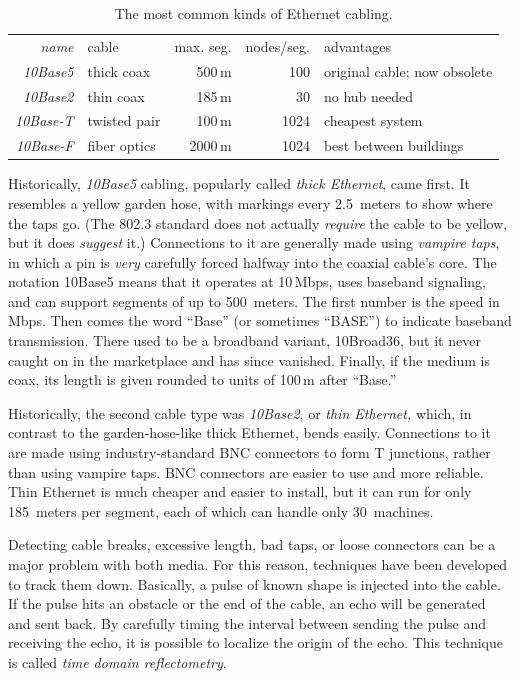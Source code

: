 \documentclass[b5paper,11pt]{memoir}
\begin{document}
\begin{table}
   \centering
   \begin{tabular}{rlrrl}
   \textit{name}     & cable         & max. seg. & nodes/seg. & advantages                   \\[.75ex]
   \textit{10Base5}  & thick coax    &    500\,m &        100 & original cable; now obsolete \\
   \textit{10Base2}  & thin coax     &    185\,m &         30 & no hub needed                \\
   \textit{10Base-T} & twisted pair  &    100\,m &       1024 & cheapest system              \\
   \textit{10Base-F} & fiber optics  &   2000\,m &       1024 & best between buildings       \\
   \end{tabular}
   \caption{The most common kinds of Ethernet cabling.}
   \label{fig:common-ethernet-cabling}
\end{table}


Historically, \emph{10Base5} cabling, popularly called \emph{thick Ethernet}, came first.
It resembles a yellow garden hose, with markings every 2.5~meters to show where the taps go.
(The 802.3 standard does not actually \emph{require} the cable to be yellow, but it does \emph{suggest} it.)
Connections to it are generally made using \emph{vampire taps}, in which a pin is \emph{very} carefully forced halfway into the coaxial cable's core.
The notation 10Base5 means that it operates at 10\,Mbps, uses baseband signaling, and can support segments of up to 500~meters.
The first number is the speed
in Mbps. Then comes the word ``Base'' (or sometimes ``BASE'') to
indicate baseband transmission. There used to be a broadband variant,
10Broad36, but it never caught on in the marketplace and has since
vanished. Finally, if the medium is coax, its length is given rounded to
units of 100\,m after ``Base.''

Historically, the second cable type was \emph{10Base2}, or \emph{thin Ethernet,}
which, in contrast to the garden-hose-like thick Ethernet, bends easily.
Connections to it are made using industry-standard BNC connectors to
form T junctions, rather than using vampire taps. BNC connectors are
easier to use and more reliable. Thin Ethernet is much cheaper and
easier to install, but it can run for only 185~meters per segment, each of which can handle only 30~machines.

Detecting cable breaks, excessive length, bad taps, or loose connectors
can be a major problem with both media. For this reason, techniques have
been developed to track them down. Basically, a pulse of known shape is
injected into the cable. If the pulse hits an obstacle or the end of the
cable, an echo will be generated and sent back. By carefully timing the
interval between sending the pulse and receiving the echo, it is
possible to localize the origin of the echo. This technique is called
\emph{time domain reflectometry}.
\end{document}
